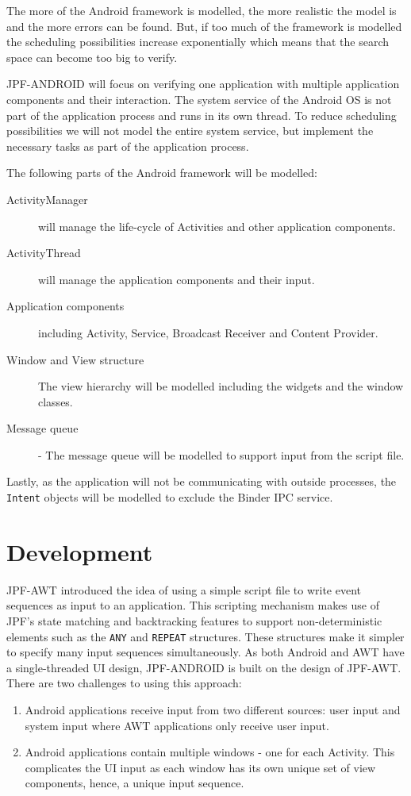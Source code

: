 \documentclass{acm_proc_article-sp}
\begin{document}
The more of the Android framework is modelled, the more realistic the model is and the more errors can be found. But, if too much
of the framework is modelled the scheduling possibilities increase exponentially which means that the search space can become too big to
verify.

JPF-ANDROID will focus on verifying one application with multiple application components and their interaction. The system service of the Android OS
is not part of the application process and runs in its own thread. To reduce scheduling possibilities we will not model the entire system
service, but implement the necessary tasks as part of the application process.

The following parts of the Android framework will be modelled:
\begin{description}
 \item [ActivityManager] will manage the life-cycle of Activities and other application components.
 \item [ActivityThread]  will manage the application components and their input.
 \item [Application components] including Activity, Service, Broadcast Receiver and Content Provider. 
 \item [Window and View structure] The view hierarchy will be modelled including the widgets and the window classes.
 \item [Message queue] - The message queue will be modelled to support input from the script file.
\end{description}

Lastly, as the application will not be communicating with outside processes, the \texttt{Intent} objects will be modelled to exclude the
Binder IPC service.

\section{Development}
JPF-AWT introduced the idea of using a simple script file to write event sequences as input to an application. This scripting mechanism makes use of
JPF's state matching and backtracking features to support non-deterministic elements such as the \texttt{ANY} and \texttt{REPEAT}
structures. These structures make it simpler to specify many input sequences simultaneously. As both Android and AWT have a single-threaded
UI design, JPF-ANDROID is built on the design of JPF-AWT. There are two challenges to using this approach:
\begin{enumerate}
 \item Android applications receive input from two different sources: user input and system input where AWT applications only receive user input.
 \item Android applications contain multiple windows - one for each Activity. This complicates the UI input as each
window has its own unique set of view components, hence, a unique input sequence.
\end{enumerate}
\end{document}
